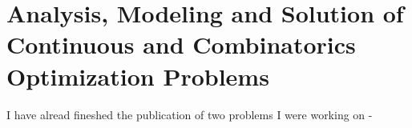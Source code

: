 \documentclass[11pt,latterpaper,twocolumn]{article}
\begin{document}
\section{Analysis, Modeling and Solution of Continuous and Combinatorics Optimization Problems}

I have alread fineshed the publication of two problems I were working on - 









\end{document}
